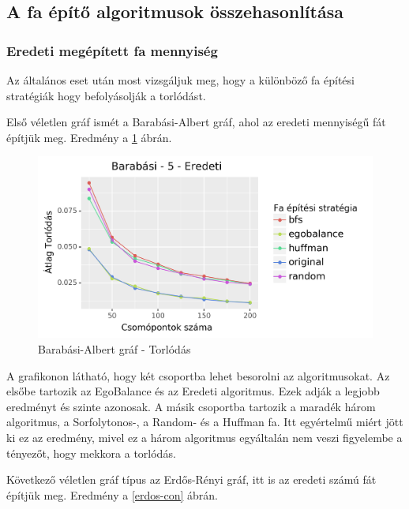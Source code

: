 \documentclass[12pt]{report}
\begin{document}
\subsection{A fa építő algoritmusok összehasonlítása}

\subsubsection{Eredeti megépített fa mennyiség}

Az általános eset után most vizsgáljuk meg, hogy a különböző fa építési stratégiák hogy befolyásolják a torlódást.

Első véletlen gráf ismét a Barabási-Albert gráf, ahol az eredeti mennyiségű fát építjük meg. 
Eredmény a \ref{barabasi-con} ábrán.

\begin{figure}[H]
	\begin{center}
		\includegraphics[width=0.9\linewidth]{pictures/barabasi_con_e.png}
		\caption{Barabási-Albert gráf - Torlódás}
		\label{barabasi-con}
	\end{center}
\end{figure}

A grafikonon látható, hogy két csoportba lehet besorolni az algoritmusokat. 
Az elsőbe tartozik az EgoBalance és az Eredeti algoritmus.
Ezek adják a legjobb eredményt és szinte azonosak.
A másik csoportba tartozik a maradék három algoritmus, a Sorfolytonos-, a Random- és a Huffman fa.
Itt egyértelmű miért jött ki ez az eredmény, mivel ez a három algoritmus egyáltalán nem veszi figyelembe a tényezőt, hogy mekkora a torlódás.

Következő véletlen gráf típus az Erdős-Rényi gráf, itt is az eredeti számú fát építjük meg. 
Eredmény a \ref{erdos-con} ábrán.
\end{document}
